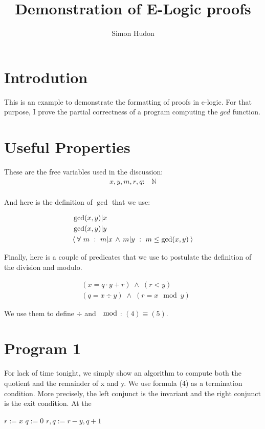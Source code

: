\documentclass[11pt]{amsart}
\title{Demonstration of E-Logic proofs}
\author{Simon Hudon}
\date{}                                           %
\begin{document}
\maketitle

\section{Introdution}
This is an example to demonstrate the formatting of proofs in e-logic.  For that purpose, I prove the partial correctness of a program computing the $gcd$ function.

\section{Useful Properties}

These are the free variables used in the discussion:
\begin{align*}
	x, y, m, r, q: &\mathbb{N} \\
\end{align*}

And here is the definition of $\gcd$ that we use:

\begin{align}
	& \gcd(x,y) | x \\
	& \gcd(x,y)| y \\
	& \langle\:\forall\ m\ :\ m|x\,\land\,m|y\ :\ m \le \gcd(x,y)\:\rangle
\end{align}

Finally, here is a couple of predicates that we use to postulate the definition of the division and modulo.

\begin{align}
	& (x = q \cdot y + r) \; \land \; (r < y) \\ 
	& (q = x \div y) \; \land \; (r = x \mod y)
\end{align}

We use them to define $\div$ and $\mod$: $(4) \equiv (5)$.

\section{Program 1}

For lack of time tonight, we simply show an algorithm to compute both the quotient and the remainder of x and y.  We use formula (4) as a termination condition.  More precisely, the left conjunct is the invariant and the right conjunct is the exit condition.  At the

\begin{algorithmic}
	\STATE $r := x$
	\STATE $q := 0$
	\REPEAT
		\STATE $r, q := r - y, q + 1$
		\STATE {}
\end{algorithmic}
\end{document}
